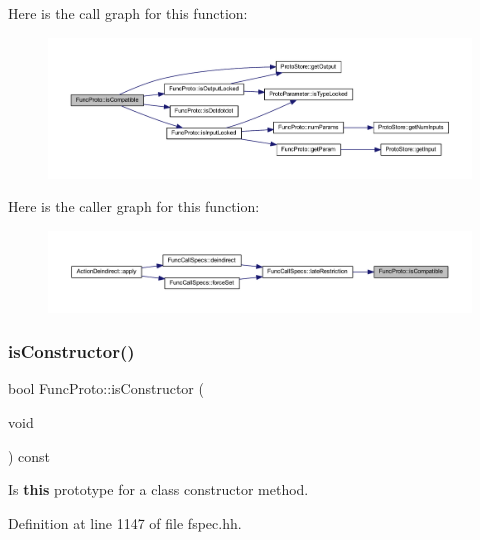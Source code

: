 Here is the call graph for this function\+:
\nopagebreak
\begin{figure}[H]
\begin{center}
\leavevmode
\includegraphics[width=350pt]{class_func_proto_aa5ee60788e6d8b4de304e2c5955a393b_cgraph}
\end{center}
\end{figure}
Here is the caller graph for this function\+:
\nopagebreak
\begin{figure}[H]
\begin{center}
\leavevmode
\includegraphics[width=350pt]{class_func_proto_aa5ee60788e6d8b4de304e2c5955a393b_icgraph}
\end{center}
\end{figure}
\mbox{\label{class_func_proto_a007c1b4a9c33831738e3ac9bc283c5a4}} 
\subsubsection{\texorpdfstring{isConstructor()}{isConstructor()}}
{\footnotesize\ttfamily bool Func\+Proto\+::is\+Constructor (\begin{DoxyParamCaption}\item[{void}]{ }\end{DoxyParamCaption}) const\hspace{0.3cm}{\ttfamily [inline]}}



Is {\bfseries{this}} prototype for a class constructor method. 



Definition at line 1147 of file fspec.\+hh.


